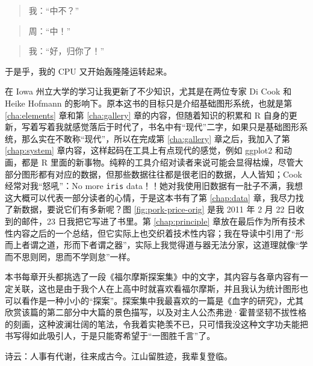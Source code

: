 \documentclass[
  b5paper,
  UTF8,twoside]{book}
\begin{document}
\begin{quote}
我：``中不？''
\end{quote}

\begin{quote}
周：``中！''
\end{quote}

\begin{quote}
我：``好，归你了！''
\end{quote}

于是乎，我的 CPU 又开始轰隆隆运转起来。

在 Iowa 州立大学的学习让我更新了不少知识，尤其是在两位专家 Di Cook 和 Heike Hofmann 的影响下。原本这书的目标只是介绍基础图形系统，也就是第 \ref{cha:elements} 章和第 \ref{cha:gallery} 章的内容，但随着知识的积累和 R 自身的更新，写着写着我就感觉落后于时代了，书名中有``现代''二字，如果只是基础图形系统，那么实在不敢称``现代''，所以在完成第 \ref{cha:gallery} 章之后，我加入了第 \ref{chap:system} 章内容，这样起码在工具上有点现代的感觉，例如 ggplot2 和动画，都是 R 里面的新事物。纯粹的工具介绍对读者来说可能会显得枯燥，尽管大部分图形都有对应的数据，但那些数据往往都是很老旧的数据，人人皆知；Cook 经常对我``怒吼''：No more \texttt{iris} data！！她对我使用旧数据有一肚子不满，我想这大概可以代表一部分读者的心情，于是这本书有了第 \ref{chap:data} 章，我尽力找了新数据，要说它们有多新呢？图 \ref{fig:pork-price-orig} 是我 2011 年 2 月 22 日收到的邮件，23 日我把它写进了书里。第 \ref{chap:principle} 章放在最后作为所有技术性内容之后的一个总结，但它实际上也交织着技术性内容；我在导读中引用了``形而上者谓之道，形而下者谓之器''，实际上我觉得道与器无法分家，这道理就像``学而不思则罔，思而不学则怠''一样。

本书每章开头都挑选了一段《福尔摩斯探案集》中的文字，其内容与各章内容有一定关联，这也是由于我个人在上高中时就喜欢看福尔摩斯，并且我认为统计图形也可以看作是一种小小的``探案''。探案集中我最喜欢的一篇是《血字的研究》，尤其欣赏该篇的第二部分中大篇的景色描写，以及对主人公杰弗逊·霍普坚韧不拔性格的刻画，这种波澜壮阔的笔法，令我着实艳羡不已，只可惜我没这种文字功夫能把书写得如此吸引人，于是只能寄希望于``一图胜千言''了。

诗云：人事有代谢，往来成古今。江山留胜迹，我辈复登临。

\backmatter
\printindex

  
\end{document}
